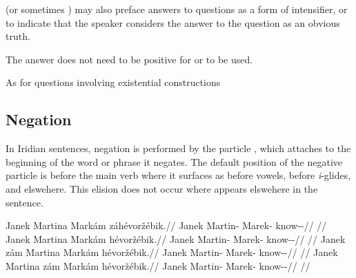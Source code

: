 \ex{}
\xe

 (or sometimes ) may also preface answers to questions as a form of intensifier, or to indicate that the speaker considers the answer to the question as an obvious truth.

\ex
{}\xe

The answer does not need to be positive for  or  to be used.

\ex{}
\xe


As for questions involving existential constructions


\subsection{Negation}

In Iridian sentences, negation is performed by the particle , which attaches to the beginning of the word or phrase  it negates. The default position of the negative particle is before the main verb where it surfaces as  before vowels,  before \emph{i}-glides, and  elswehere. This elision does not occur where  appears elswehere in the sentence.

\pex
\a
\begingl
    \gla Janek Martina Markám {zá}hévoržébik.//
    \glb Janek Martin-\Acc{} Marek-\Agt{} \Neg{}know-\Ben{}-\Pf{}//
    \glft {}//
\endgl
\a
\begingl
     Janek Martina Markám hévoržébik.//
    \glb \Neg{} Janek Martin-\Acc{} Marek-\Agt{} know-\Ben{}-\Pf{}//
    \glft {}//
\endgl
\a
\begingl
    \gla Janek {zám} Martina Markám hévoržébik.//
    \glb Janek \Neg{} Martin-\Acc{} Marek-\Agt{} know-\Ben{}-\Pf{}//
    \glft {}//
\endgl
\a
\begingl
    \gla Janek Martina {zám} Markám hévoržébik.//
    \glb Janek Martin-\Acc{} \Neg{} Marek-\Agt{} know-\Ben{}-\Pf{}//
    \glft {}//
\endgl
\xe

